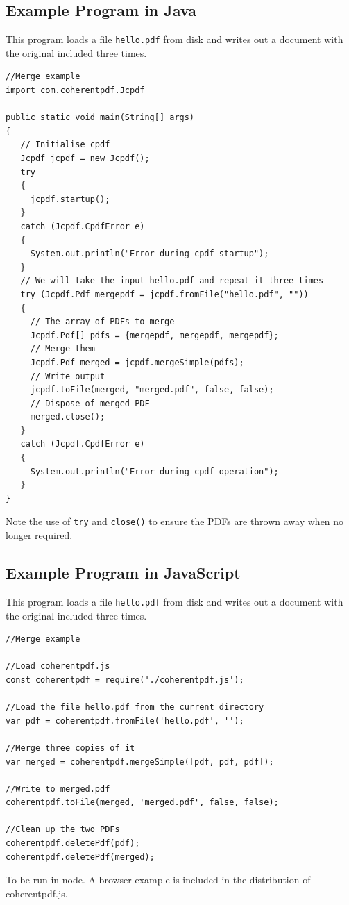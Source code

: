 \documentclass{book}
\begin{document}
\begin{jcpdflib}
\chapter*{Example Program in Java}

This program loads a file \texttt{hello.pdf} from disk and writes out a
document with the original included three times.

\begin{small}
\begin{verbatim}
//Merge example
import com.coherentpdf.Jcpdf

public static void main(String[] args)
{
   // Initialise cpdf
   Jcpdf jcpdf = new Jcpdf();
   try
   {
     jcpdf.startup();
   }
   catch (Jcpdf.CpdfError e)
   {
     System.out.println("Error during cpdf startup");
   }
   // We will take the input hello.pdf and repeat it three times
   try (Jcpdf.Pdf mergepdf = jcpdf.fromFile("hello.pdf", ""))
   {
     // The array of PDFs to merge
     Jcpdf.Pdf[] pdfs = {mergepdf, mergepdf, mergepdf};
     // Merge them
     Jcpdf.Pdf merged = jcpdf.mergeSimple(pdfs);
     // Write output
     jcpdf.toFile(merged, "merged.pdf", false, false);
     // Dispose of merged PDF
     merged.close();
   }
   catch (Jcpdf.CpdfError e)
   {
     System.out.println("Error during cpdf operation");
   }
}
\end{verbatim}
\end{small}

\noindent Note the use of \texttt{try} and \texttt{close()} to ensure the PDFs are thrown away when no longer required.
\end{jcpdflib}

\begin{jscpdflib}
\chapter*{Example Program in JavaScript}

This program loads a file \texttt{hello.pdf} from disk and writes out a
document with the original included three times.

\begin{small}
\begin{verbatim}
//Merge example

//Load coherentpdf.js
const coherentpdf = require('./coherentpdf.js');

//Load the file hello.pdf from the current directory
var pdf = coherentpdf.fromFile('hello.pdf', '');

//Merge three copies of it
var merged = coherentpdf.mergeSimple([pdf, pdf, pdf]);

//Write to merged.pdf
coherentpdf.toFile(merged, 'merged.pdf', false, false);

//Clean up the two PDFs
coherentpdf.deletePdf(pdf);
coherentpdf.deletePdf(merged);
\end{verbatim}
\end{small}

\noindent To be run in node. A browser example is included in the distribution of coherentpdf.js.
\end{jscpdflib}
\end{document}

